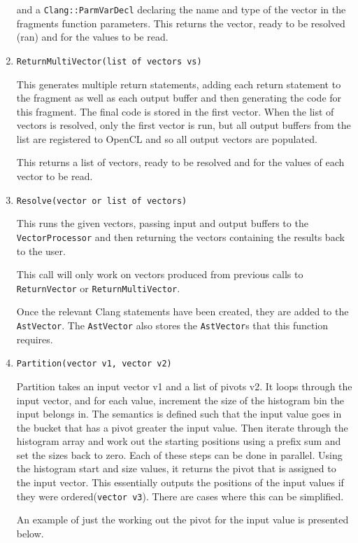 \begin{enumerate}
and a \texttt{Clang::ParmVarDecl} declaring the name and type of the vector in the fragments function parameters. This returns the vector, ready to be resolved (ran) and for the values to be read.

\item \texttt{ReturnMultiVector(list of vectors vs)}

This generates multiple return statements, adding each return statement to the fragment as well as each output buffer and then generating the code for this fragment. The final code is stored in the first vector. When the list of vectors is resolved, only the first vector is run, but all output buffers from the list are registered to OpenCL and so all output vectors are populated. 

This returns a list of vectors, ready to be resolved and for the values of each vector to be read.

\item \texttt{Resolve(vector or list of vectors)}

This runs the given vectors, passing input and output buffers to the \texttt{VectorProcessor} and then returning the vectors containing the results back to the user.

This call will only work on vectors produced from previous calls to \texttt{ReturnVector} or \texttt{ReturnMultiVector}.
 
Once the relevant Clang statements have been created, they are added to the \texttt{AstVector}. The \texttt{AstVector} also stores the \texttt{AstVector}s that this function requires.

\item \texttt{Partition(vector v1, vector v2)}

Partition takes an input vector v1 and a list of pivots v2. It loops through the input vector, and for each value, increment the size of the histogram bin the input belongs in. The semantics is defined such that the input value goes in the bucket that has a pivot greater the input value. Then iterate through the histogram array and work out the starting positions using a prefix sum and set the sizes back to zero. Each of these steps can be done in parallel. \cite{Maleki:2016:HTM:2980983.2908089}
Using the histogram start and size values, it returns the pivot that is assigned to the input vector. This essentially outputs the positions of the input values if they were ordered(\texttt{vector v3}). There are cases where this can be simplified.

An example of just the working out the pivot for the input value is presented below. 


\end{enumerate}
